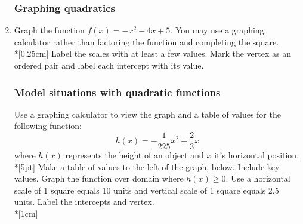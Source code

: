 \documentclass[12pt, twoside]{article}
\begin{document}
\begin{enumerate}
\newpage
\subsubsection*{Graphing quadratics}
\item Graph the function $f(x)=-x^2-4x+5$. You may use a graphing calculator rather than factoring the function and completing the square.\\*[0.25cm]
Label the scales with at least a few values. Mark the vertex as an ordered pair and label each intercept with its value.

\begin{center}
\end{center}

\newpage
\subsubsection*{Model situations with quadratic functions}

Use a graphing calculator to view the graph and a table of values for the following function:
\[h(x)=-\frac{1}{225}x^2+\frac{2}{3}x\]
where $h(x)$ represents the height of an object and $x$ it's horizontal position.\\*[5pt]
Make a table of values to the left of the graph, below. Include key values. Graph the function over domain where $h(x) \geq 0$. Use a horizontal scale of 1 square equals 10 units and vertical scale of 1 square equals 2.5 units. Label the intercepts and vertex.\\*[1cm]

\begin{flushright}
\end{flushright}
           
\end{enumerate}
\end{document}
